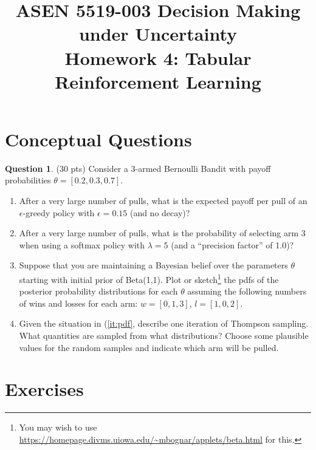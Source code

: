 \documentclass{article}
\title{ASEN 5519-003 Decision Making under Uncertainty\\
       Homework 4: Tabular Reinforcement Learning}
\theoremstyle{definition}
\newtheorem{question}[thm]{Question}
\begin{document}
\maketitle

\section{Conceptual Questions}

\begin{question}
    (30 pts) Consider a 3-armed Bernoulli Bandit with payoff probabilities $\theta = [0.2, 0.3, 0.7]$.
    \begin{enumerate}[label=\alph*),noitemsep]
        \item After a very large number of pulls, what is the expected payoff per pull of an $\epsilon$-greedy policy with $\epsilon=0.15$ (and no decay)?
        \item After a very large number of pulls, what is the probability of selecting arm 3 when using a softmax policy with $\lambda=5$ (and a ``precision factor'' of 1.0)?
        \item Suppose that you are maintaining a Bayesian belief over the parameters $\theta$ starting with initial prior of Beta(1,1). Plot or sketch\footnote{You may wish to use \url{https://homepage.divms.uiowa.edu/~mbognar/applets/beta.html} for this.} the pdfs of the posterior probability distributions for each $\theta$ assuming the following numbers of wins and losses for each arm: $w = [0, 1, 3]$, $l = [1, 0, 2]$.\label{it:pdf}
        \item Given the situation in (\ref{it:pdf}, describe one iteration of Thompson sampling. What quantities are sampled from what distributions? Choose some plausible values for the random samples and indicate which arm will be pulled.
    \end{enumerate}
\end{question}

\section{Exercises}
\end{document}
